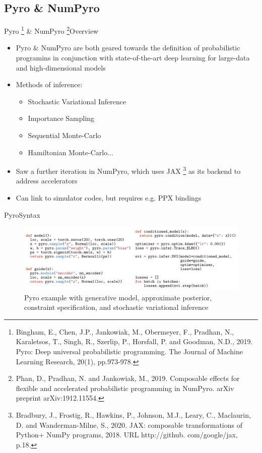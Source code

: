 \documentclass[AERbeamer%
              ,optEnglish%
              ,optBiber%
              ,optBibstyleAlphabetic%
              ,optBeamerClassicFormat%
              ]{AERlatex}%
\begin{document}
\subsection{Pyro \& NumPyro}
\begin{frame}[c]{Pyro \footnote{Bingham, E., Chen, J.P., Jankowiak, M., Obermeyer, F., Pradhan, N., Karaletsos, T.,
                                Singh, R., Szerlip, P., Horsfall, P. and Goodman, N.D., 2019. Pyro: Deep universal
                                probabilistic programming. The Journal of Machine Learning Research, 20(1), pp.973-978.}
                \& NumPyro \footnote{Phan, D., Pradhan, N. and Jankowiak, M., 2019. Composable effects for flexible and
                                     accelerated probabilistic programming in NumPyro. arXiv preprint arXiv:1912.11554.}}{Overview}
    \centering
    \begin{itemize}
        \item Pyro \& NumPyro are both geared towards the definition of probabilistic programins in conjunction with state-of-the-art
              deep learning for large-data and high-dimensional models
        \item Methods of inference:
        \begin{itemize}
            \item Stochastic Variational Inference
            \item Importance Sampling
            \item Sequential Monte-Carlo
            \item Hamiltonian Monte-Carlo...
        \end{itemize}
        \item Saw a further iteration in NumPyro, which uses JAX \footnote{Bradbury, J., Frostig, R., Hawkins, P., Johnson, M.J., Leary, C., Maclaurin, D. and Wanderman-Milne, S., 2020. JAX: composable transformations of Python+ NumPy programs, 2018. URL http://github. com/google/jax, p.18.} as its backend to address accelerators
        \item Can link to simulator codes, but requires e.g. PPX bindings
    \end{itemize}
\end{frame}


\begin{frame}[c]{Pyro}{Syntax}
    \centering
    \begin{figure}
        \centering
        \includegraphics[width=\textwidth]{PyroSyntax.png}
        \caption{Pyro example with generative model, approximate posterior, constraint specification, and stochastic variational inference}
    \end{figure}
\end{frame}
\end{document}
